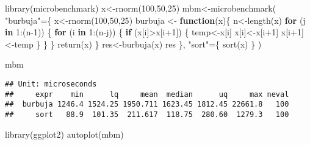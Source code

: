 \documentclass[]{elsarticle} %
\newenvironment{Shaded}{\begin{snugshade}}{\end{snugshade}}
\newcommand{\ControlFlowTok}[1]{\textcolor[rgb]{0.13,0.29,0.53}{\textbf{#1}}}
\newcommand{\DecValTok}[1]{\textcolor[rgb]{0.00,0.00,0.81}{#1}}
\newcommand{\FunctionTok}[1]{\textcolor[rgb]{0.00,0.00,0.00}{#1}}
\newcommand{\NormalTok}[1]{#1}
\newcommand{\OtherTok}[1]{\textcolor[rgb]{0.56,0.35,0.01}{#1}}
\newcommand{\SpecialCharTok}[1]{\textcolor[rgb]{0.00,0.00,0.00}{#1}}
\newcommand{\StringTok}[1]{\textcolor[rgb]{0.31,0.60,0.02}{#1}}
\begin{document}
\begin{Shaded}
\begin{Highlighting}[]
\FunctionTok{library}\NormalTok{(microbenchmark)}
\NormalTok{x}\OtherTok{\textless{}{-}}\FunctionTok{rnorm}\NormalTok{(}\DecValTok{100}\NormalTok{,}\DecValTok{50}\NormalTok{,}\DecValTok{25}\NormalTok{)}
\NormalTok{mbm}\OtherTok{\textless{}{-}}\FunctionTok{microbenchmark}\NormalTok{(}
  \StringTok{"burbuja"}\OtherTok{=}\NormalTok{\{}
\NormalTok{    x}\OtherTok{\textless{}{-}}\FunctionTok{rnorm}\NormalTok{(}\DecValTok{100}\NormalTok{,}\DecValTok{50}\NormalTok{,}\DecValTok{25}\NormalTok{)}
\NormalTok{burbuja }\OtherTok{\textless{}{-}} \ControlFlowTok{function}\NormalTok{(x)\{}
\NormalTok{  n}\OtherTok{\textless{}{-}}\FunctionTok{length}\NormalTok{(x)}
  \ControlFlowTok{for}\NormalTok{ (j }\ControlFlowTok{in} \DecValTok{1}\SpecialCharTok{:}\NormalTok{(n}\DecValTok{{-}1}\NormalTok{)) \{}
    \ControlFlowTok{for}\NormalTok{ (i }\ControlFlowTok{in} \DecValTok{1}\SpecialCharTok{:}\NormalTok{(n}\SpecialCharTok{{-}}\NormalTok{j)) \{}
      \ControlFlowTok{if}\NormalTok{ (x[i]}\SpecialCharTok{\textgreater{}}\NormalTok{x[i}\SpecialCharTok{+}\DecValTok{1}\NormalTok{]) \{}
\NormalTok{        temp}\OtherTok{\textless{}{-}}\NormalTok{x[i]}
\NormalTok{        x[i]}\OtherTok{\textless{}{-}}\NormalTok{x[i}\SpecialCharTok{+}\DecValTok{1}\NormalTok{]}
\NormalTok{        x[i}\SpecialCharTok{+}\DecValTok{1}\NormalTok{]}\OtherTok{\textless{}{-}}\NormalTok{temp}
\NormalTok{      \}}
\NormalTok{    \}}
\NormalTok{  \}}
  \FunctionTok{return}\NormalTok{(x)}
\NormalTok{\}}
\NormalTok{res}\OtherTok{\textless{}{-}}\FunctionTok{burbuja}\NormalTok{(x)}
\NormalTok{res}
\NormalTok{  \},}
\StringTok{"sort"}\OtherTok{=}\NormalTok{\{}
  \FunctionTok{sort}\NormalTok{(x)}
\NormalTok{\}}
\NormalTok{)}

\NormalTok{mbm}
\end{Highlighting}
\end{Shaded}

\begin{verbatim}
## Unit: microseconds
##     expr    min      lq     mean  median      uq     max neval
##  burbuja 1246.4 1524.25 1950.711 1623.45 1812.45 22661.8   100
##     sort   88.9  101.35  211.617  118.75  280.60  1279.3   100
\end{verbatim}

\begin{Shaded}
\begin{Highlighting}[]
\FunctionTok{library}\NormalTok{(ggplot2)}
\FunctionTok{autoplot}\NormalTok{(mbm)}
\end{Highlighting}
\end{Shaded}
\end{document}
